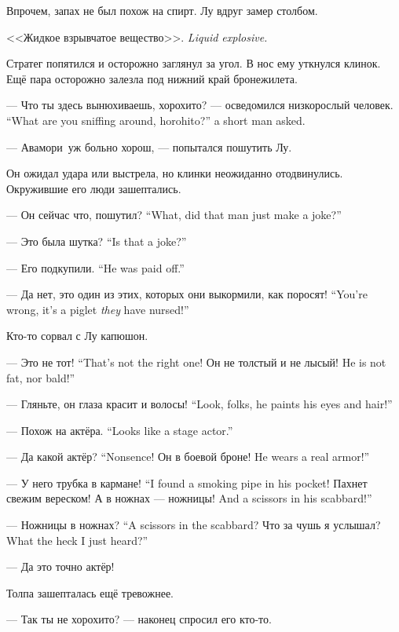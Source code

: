 Впрочем, запах не был похож на спирт.
Лу вдруг замер столбом.

{<<Жидкое взрывчатое вещество>>.}
{\emph{Liquid explosive.}}

Стратег попятился и осторожно заглянул за угол.
В нос ему уткнулся клинок.
Ещё пара осторожно залезла под нижний край бронежилета.

{--- Что ты здесь вынюхиваешь, хорохито? --- осведомился низкорослый человек.}
{``What are you sniffing around, horohito?'' a short man asked.}

--- Авамори\FM\ уж больно хорош, --- попытался пошутить Лу.

Он ожидал удара или выстрела, но клинки неожиданно отодвинулись.
Окружившие его люди зашептались.

{--- Он сейчас что, пошутил?}
{``What, did that man just make a joke?''}

{--- Это была шутка?}
{``Is that a joke?''}

{--- Его подкупили.}
{``He was paid off.''}

{--- Да нет, это один из этих, которых они выкормили, как поросят!}
{``You're wrong, it's a piglet \emph{they} have nursed!''}

Кто-то сорвал с Лу капюшон.

{--- Это не тот!}
{``That's not the right one!}
{Он не толстый и не лысый!}
{He is not fat, nor bald!''}

{--- Гляньте, он глаза красит и волосы!}
{``Look, folks, he paints his eyes and hair!''}

{--- Похож на актёра.}
{``Looks like a stage actor.''}

{--- Да какой актёр?}
{``Nonsence!}
{Он в боевой броне!}
{He wears a real armor!''}

{--- У него трубка в кармане!}
{``I found a smoking pipe in his pocket!}
Пахнет свежим вереском!
{А в ножнах --- ножницы!}
{And a scissors in his scabbard!''}

{--- Ножницы в ножнах?}
{``A scissors in the scabbard?}
{Что за чушь я услышал?}
{What the heck I just heard?''}

--- Да это точно актёр!

Толпа зашепталась ещё тревожнее.

--- Так ты не хорохито? --- наконец спросил его кто-то.

